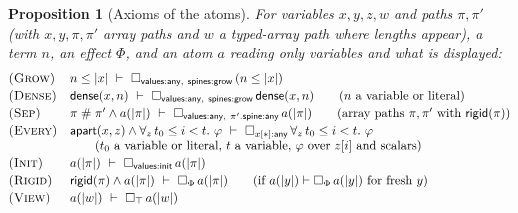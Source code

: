 \documentclass[10pt,a4paper]{article}
\newtheorem{proposition}[theorem]{Proposition}
\theoremstyle{definition}
\theoremstyle{remark}
\newcommand{\bx}[1]{\Box_{#1}}
\newcommand{\sep}{\mathrel{\#}}
\newcommand{\kw}[1]{\mathsf{#1}}
\newcommand{\init}{\kw{init}}
\newcommand{\grow}{\kw{grow}}
\newcommand{\any}{\kw{any}}
\newcommand{\val}{\kw{values}}
\newcommand{\st}{\kw{spines}}
\newcommand{\rigid}{\kw{rigid}}
\newcommand{\dense}{\kw{dense}}
\newcommand{\apart}{\kw{apart}}
\newcommand{\len}[1]{|#1|}
\begin{document}
\begin{proposition}[Axioms of the atoms]\label{prop:axioms}
For variables $x,y,z,w$ and paths $\pi,\pi'$ (with $x,y,\pi,\pi'$ array
paths and $w$ a typed-array path where lengths appear), a term $n$, an
effect $\Phi$, and an atom $a$ reading only variables and what is displayed:
{\small\begin{displaymath}
\begin{array}{@{}ll@{}}
\textsc{(Grow)} & n\le\len x\ \vdash\ \bx{\val:\any,\ \st:\grow}\,(n\le\len x)\\[2pt]
\textsc{(Dense)} & \dense(x,n)\ \vdash\ \bx{\val:\any,\ \st:\grow}\,\dense(x,n)\qquad (n\text{ a variable or literal})\\[2pt]
\textsc{(Sep)} & \pi\sep\pi'\wedge a(\len\pi)\ \vdash\ \bx{\val:\any,\ \pi'.\kw{spine}:\any}\,a(\len\pi)\qquad (\text{array paths }\pi,\pi'\text{ with }\rigid(\pi))\\[2pt]
\textsc{(Every)} & \apart(x,z)\wedge\forall_{z}\, t_0\le i<t.\ \varphi\ \vdash\ \bx{x[\ast]:\any}\,\forall_{z}\, t_0\le i<t.\ \varphi\\
 & \qquad (t_0\text{ a variable or literal, }t\text{ a variable, }\varphi\text{ over }z[i]\text{ and scalars})\\[2pt]
\textsc{(Init)} & a(\len\pi)\ \vdash\ \bx{\val:\init}\,a(\len\pi)\\[2pt]
\textsc{(Rigid)} & \rigid(\pi)\wedge a(\len{\pi})\ \vdash\ \bx{\Phi}\,a(\len\pi)\qquad (\text{if }a(\len y)\vdash\bx{\Phi}\,a(\len y)\text{ for fresh }y)\\[2pt]
\textsc{(View)} & a(\len w)\ \vdash\ \bx{\top}\,a(\len w)
\end{array}
\end{displaymath}}
\end{proposition}
\end{document}
